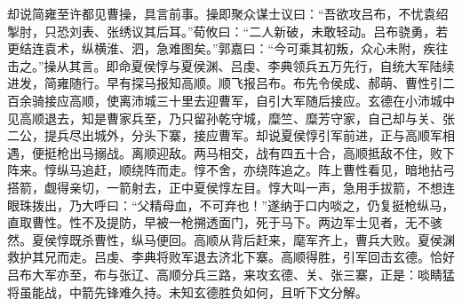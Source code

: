 却说简雍至许都见曹操，具言前事。操即聚众谋士议曰：“吾欲攻吕布，不忧袁绍掣肘，只恐刘表、张绣议其后耳。”荀攸曰：“二人新破，未敢轻动。吕布骁勇，若更结连袁术，纵横淮、泗，急难图矣。”郭嘉曰：“今可乘其初叛，众心未附，疾往击之。”操从其言。即命夏侯惇与夏侯渊、吕虔、李典领兵五万先行，自统大军陆续进发，简雍随行。早有探马报知高顺。顺飞报吕布。布先令侯成、郝萌、曹性引二百余骑接应高顺，使离沛城三十里去迎曹军，自引大军随后接应。玄德在小沛城中见高顺退去，知是曹家兵至，乃只留孙乾守城，糜竺、糜芳守家，自己却与关、张二公，提兵尽出城外，分头下寨，接应曹军。却说夏侯惇引军前进，正与高顺军相遇，便挺枪出马搦战。离顺迎敌。两马相交，战有四五十合，高顺抵敌不住，败下阵来。惇纵马追赶，顺绕阵而走。惇不舍，亦绕阵追之。阵上曹性看见，暗地拈弓搭箭，觑得亲切，一箭射去，正中夏侯惇左目。惇大叫一声，急用手拔箭，不想连眼珠拨出，乃大呼曰：“父精母血，不可弃也！”遂纳于口内啖之，仍复挺枪纵马，直取曹性。性不及提防，早被一枪搠透面门，死于马下。两边军士见者，无不骇然。夏侯惇既杀曹性，纵马便回。高顺从背后赶来，麾军齐上，曹兵大败。夏侯渊救护其兄而走。吕虔、李典将败军退去济北下寨。高顺得胜，引军回击玄德。恰好吕布大军亦至，布与张辽、高顺分兵三路，来攻玄德、关、张三寨，正是：啖睛猛将虽能战，中箭先锋难久持。未知玄德胜负如何，且听下文分解。